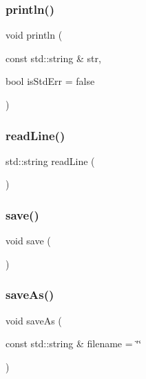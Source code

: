 \subsubsection{\texorpdfstring{println()}{println()}\hspace{0.1cm}{\footnotesize\ttfamily [2/2]}}
{\footnotesize\ttfamily void println (\begin{DoxyParamCaption}\item[{const std\+::string \&}]{str,  }\item[{bool}]{is\+Std\+Err = {\ttfamily false} }\end{DoxyParamCaption})\hspace{0.3cm}{\ttfamily [virtual]}}

\mbox{\label{classGConsoleWindow_a889e9bbe7d0bcf8206320094d538f4b6}} 
\subsubsection{\texorpdfstring{read\+Line()}{readLine()}}
{\footnotesize\ttfamily std\+::string read\+Line (\begin{DoxyParamCaption}{ }\end{DoxyParamCaption})\hspace{0.3cm}{\ttfamily [virtual]}}

\mbox{\label{classGConsoleWindow_aae2c382151ef7c9aa913361172b30db6}} 
\subsubsection{\texorpdfstring{save()}{save()}}
{\footnotesize\ttfamily void save (\begin{DoxyParamCaption}{ }\end{DoxyParamCaption})\hspace{0.3cm}{\ttfamily [virtual]}}

\mbox{\label{classGConsoleWindow_a7be1f340a7a83cab38ed53f1322b86b7}} 
\subsubsection{\texorpdfstring{save\+As()}{saveAs()}}
{\footnotesize\ttfamily void save\+As (\begin{DoxyParamCaption}\item[{const std\+::string \&}]{filename = {\ttfamily \char`\"{}\char`\"{}} }\end{DoxyParamCaption})\hspace{0.3cm}{\ttfamily [virtual]}}

